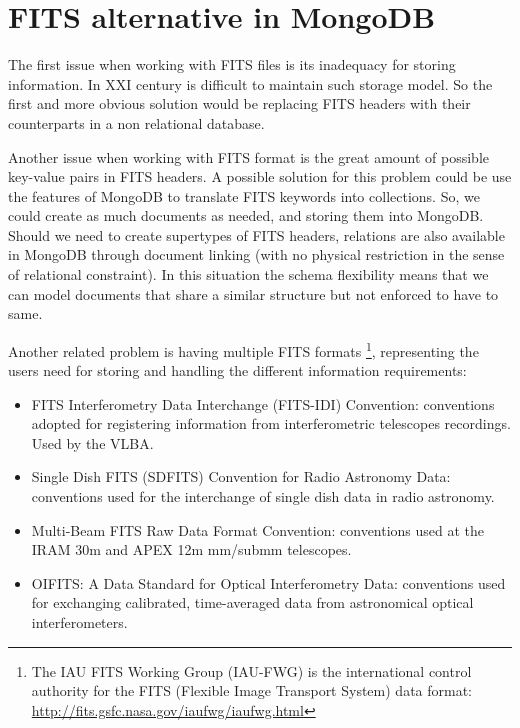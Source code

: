 

\section{FITS alternative in MongoDB}

The first issue when working with FITS files is its inadequacy for storing information. In XXI century is difficult to maintain such storage model. So the first and more obvious solution would be replacing FITS headers with their counterparts in a non relational database. 

Another issue when working with FITS format is the great amount of possible key-value pairs in FITS headers. A possible solution for this problem could be use the features of MongoDB to translate FITS keywords into collections. So, we could create as much documents as needed, and storing them into MongoDB. Should we need to create supertypes of FITS headers, relations are also available in MongoDB through document linking (with no physical restriction in the sense of relational constraint). In this situation the schema flexibility means that we can model documents that share a similar structure but not enforced to have to same.

Another related problem is having multiple FITS formats \footnote{The IAU FITS Working Group (IAU-FWG) is the international control authority for the FITS (Flexible Image Transport System) data format: \url{http://fits.gsfc.nasa.gov/iaufwg/iaufwg.html}}, representing the users need for storing and handling the different information requirements:

\begin{itemize}
\item FITS Interferometry Data Interchange (FITS-IDI) Convention: conventions adopted for registering information from interferometric telescopes recordings. Used by the VLBA.
\item Single Dish FITS (SDFITS) Convention for Radio Astronomy Data: conventions used for the interchange of single dish data in radio astronomy. 
\item Multi-Beam FITS Raw Data Format Convention: conventions used at the IRAM 30m and APEX 12m mm/submm telescopes.
\item OIFITS: A Data Standard for Optical Interferometry Data: conventions used for exchanging calibrated, time-averaged data from astronomical optical interferometers.
\end{itemize}



